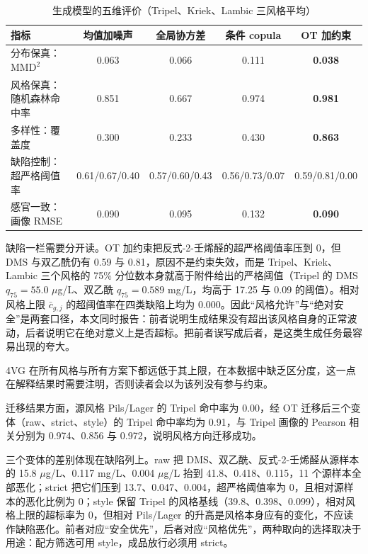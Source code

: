 ﻿\documentclass[UTF8,a4paper,zihao=-4]{ctexart}
\numberwithin{figure}{section}
\numberwithin{table}{section}
\numberwithin{equation}{section}
\begin{document}
\begin{table}[H]
  \centering
  \caption{生成模型的五维评价（Tripel、Kriek、Lambic 三风格平均）}
  \label{tab:q3-res}
  \footnotesize
  \begin{tabularx}{\textwidth}{@{}>{\raggedright\arraybackslash}X c c c c@{}}
    \toprule
    指标 & 均值加噪声 & 全局协方差 & 条件 copula & OT 加约束 \\
    \midrule
    分布保真：$\mathrm{MMD}^2$ & 0.063 & 0.066 & 0.111 & \textbf{0.038} \\
    风格保真：随机森林命中率 & 0.851 & 0.667 & 0.974 & \textbf{0.981} \\
    多样性：覆盖度 & 0.300 & 0.233 & 0.430 & \textbf{0.863} \\
    缺陷控制：超严格阈值率 & 0.61/0.67/0.40 & 0.57/0.60/0.43 & 0.56/0.73/0.07 & 0.59/0.81/0.00 \\
    感官一致：画像 RMSE & 0.090 & 0.095 & 0.132 & \textbf{0.090} \\
    \bottomrule
  \end{tabularx}
\end{table}

缺陷一栏需要分开读。OT 加约束把反式-2-壬烯醛的超严格阈值率压到 0，但 DMS 与双乙酰仍有 0.59 与 0.81，原因不是约束失效，而是 Tripel、Kriek、Lambic 三个风格的 75\% 分位数本身就高于附件给出的严格阈值（Tripel 的 DMS $q_{75}=55.0$ $\mu$g/L、双乙酰 $q_{75}=0.589$ mg/L，均高于 17.25 与 0.09 的阈值）。相对风格上限 $\bar{c}_{g,j}$ 的超阈值率在四类缺陷上均为 0.000。因此“风格允许”与“绝对安全”是两套口径，本文同时报告：前者说明生成结果没有超出该风格自身的正常波动，后者说明它在绝对意义上是否超标。把前者误写成后者，是这类生成任务最容易出现的夸大。

4VG 在所有风格与所有方案下都远低于其上限，在本数据中缺乏区分度，这一点在解释结果时需要注明，否则读者会以为该列没有参与约束。

迁移结果方面，源风格 Pils/Lager 的 Tripel 命中率为 0.00，经 OT 迁移后三个变体（raw、strict、style）的 Tripel 命中率均为 0.91，与 Tripel 画像的 Pearson 相关分别为 0.974、0.856 与 0.972，说明风格方向迁移成功。

三个变体的差别体现在缺陷列上。raw 把 DMS、双乙酰、反式-2-壬烯醛从源样本的 15.8 $\mu$g/L、0.117 mg/L、0.004 $\mu$g/L 抬到 41.8、0.418、0.115，11 个源样本全部恶化；strict 把它们压到 13.7、0.047、0.004，超严格阈值率为 0，且相对源样本的恶化比例为 0；style 保留 Tripel 的风格基线（39.8、0.398、0.099），相对风格上限的超标率为 0，但相对 Pils/Lager 的升高是风格本身应有的变化，不应读作缺陷恶化。前者对应“安全优先”，后者对应“风格优先”，两种取向的选择取决于用途：配方筛选可用 style，成品放行必须用 strict。
\end{document}
